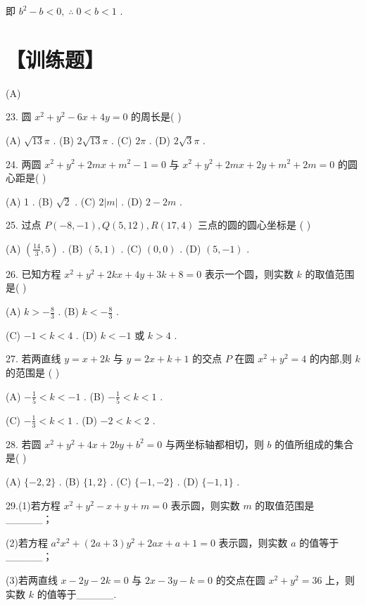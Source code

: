 \documentclass[10pt]{article}
\begin{document}
即 \({b}^{2} - b < 0,\;\therefore \;0 < b < 1\) .

\section*{【训练题】}

(A)

23. 圆 \({x}^{2} + {y}^{2} - {6x} + {4y} = 0\) 的周长是( )

(A) \(\sqrt{13}\pi\) . (B) \(2\sqrt{13}\pi\) . (C) \({2\pi }\) . (D) \(2\sqrt{3}\pi\) .

24. 两圆 \({x}^{2} + {y}^{2} + {2mx} + {m}^{2} - 1 = 0\) 与 \({x}^{2} + {y}^{2} + {2mx} + {2y} + {m}^{2} + {2m} = 0\) 的圆心距是( )

(A) 1 . (B) \(\sqrt{2}\) . (C) \(2\left| m\right|\) . (D) \(2 - {2m}\) .

25. 过点 \(P\left( {-8, - 1}\right) ,Q\left( {5,{12}}\right) ,R\left( {{17},4}\right)\) 三点的圆的圆心坐标是 ( )

(A) \(\left( {\frac{14}{3},5}\right)\) . (B) \(\left( {5,1}\right)\) . (C) \(\left( {0,0}\right)\) . (D) \(\left( {5, - 1}\right)\) .

26. 已知方程 \({x}^{2} + {y}^{2} + {2kx} + {4y} + {3k} + 8 = 0\) 表示一个圆，则实数 \(k\) 的取值范围是( )

(A) \(k >  - \frac{8}{3}\) . (B) \(k <  - \frac{8}{3}\) .

(C) \(- 1 < k < 4\) . (D) \(k <  - 1\) 或 \(k > 4\) .

27. 若两直线 \(y = x + {2k}\) 与 \(y = {2x} + k + 1\) 的交点 \(P\) 在圆 \({x}^{2} + {y}^{2} = 4\) 的内部,则 \(k\) 的范围是 ( )

(A) \(- \frac{1}{5} < k <  - 1\) . (B) \(- \frac{1}{5} < k < 1\) .

(C) \(- \frac{1}{3} < k < 1\) . (D) \(- 2 < k < 2\) .

28. 若圆 \({x}^{2} + {y}^{2} + {4x} + {2by} + {b}^{2} = 0\) 与两坐标轴都相切，则 \(b\) 的值所组成的集合是( )

(A) \(\{  - 2,2\}\) . (B) \(\{ 1,2\}\) . (C) \(\{  - 1, - 2\}\) . (D) \(\{  - 1,1\}\) .

29.(1)若方程 \({x}^{2} + {y}^{2} - x + y + m = 0\) 表示圆，则实数 \(m\) 的取值范围是\_\_\_\_\_；

(2)若方程 \({a}^{2}{x}^{2} + \left( {{2a} + 3}\right) {y}^{2} + {2ax} + a + 1 = 0\) 表示圆，则实数 \(a\) 的值等于\_\_\_\_\_；

(3)若两直线 \(x - {2y} - {2k} = 0\) 与 \({2x} - {3y} - k = 0\) 的交点在圆 \({x}^{2} + {y}^{2} = {36}\) 上，则实数 \(k\) 的值等于\_\_\_\_\_.
\end{document}
